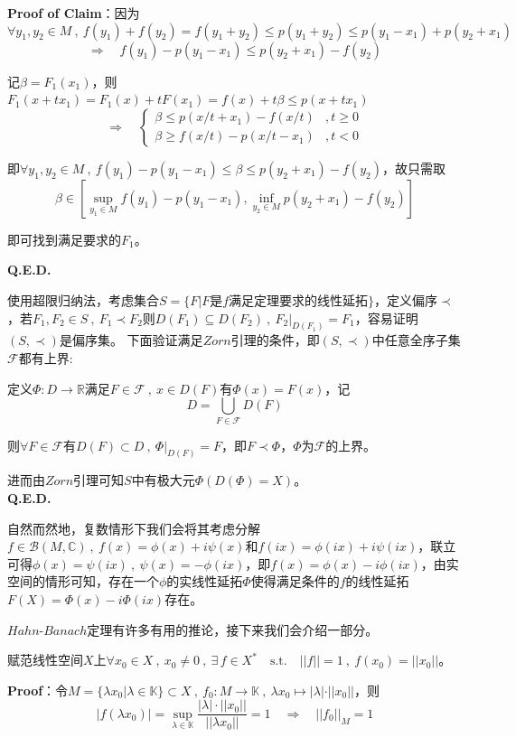 \textbf{Proof of Claim}：因为
\[\forall y_1,y_2 \in M \ , \ f(y_1)+f(y_2)=f(y_1+y_2) \leq p(y_1+y_2) \leq p(y_1-x_1) + p(y_2+x_1)\]
\[\Rightarrow \quad f(y_1)-p(y_1-x_1) \leq p(y_2+x_1)-f(y_2)\]

记$\beta=F_1(x_1)$，则$F_1(x+tx_1)=F_1(x)+tF(x_1)=f(x)+t\beta \leq p(x+tx_1)$
\[\Rightarrow \quad \left\{
\begin{array}{ll}
    \beta \leq p(x/t+x_1)-f(x/t) & ,t \geq 0 \\
    \beta \geq f(x/t)-p(x/t-x_1) & ,t < 0
\end{array}
\right.\]

即$\forall y_1,y_2 \in M \ , \ f(y_1)-p(y_1-x_1) \leq \beta \leq p(y_2+x_1)-f(y_2)$，故只需取
\[\beta \in \left[\sup_{y_1 \in M}f(y_1)-p(y_1-x_1),\inf_{y_2 \in M}p(y_2+x_1)-f(y_2)\right]\]

即可找到满足要求的$F_1$。

\textbf{Q.E.D.}

使用超限归纳法，考虑集合$S=\{F|F\text{是}f\text{满足定理要求的线性延拓}\}$，定义偏序$\prec$，若$F_1,F_2 \in S \ , \ F_1 \prec F_2$则$D(F_1) \subseteq D(F_2) \ , \ F_2|_{D(F_1)}=F_1$，容易证明$(S,\prec)$是偏序集。
下面验证满足$Zorn$引理的条件，即$(S,\prec)$中任意全序子集$\mathscr{F}$都有上界:

定义$\Phi:D \to \mathbb{R}$满足$F \in \mathscr{F} \ , \ x \in D(F)$有$\Phi(x)=F(x)$，记
\[D=\bigcup_{F \in \mathscr{F}}D(F)\]

则$\forall F \in \mathscr{F}$有$D(F) \subset D \ , \ \Phi|_{D(F)}=F$，即$F \prec \Phi$，$\Phi$为$\mathscr{F}$的上界。

进而由$Zorn$引理可知$S$中有极大元$\Phi (D(\Phi)=X)$。\\
\textbf{Q.E.D.}

自然而然地，复数情形下我们会将其考虑分解$f \in \mathscr{B}(M,\mathbb{C}) \ , \ f(x)=\phi(x)+i\psi(x)$和$f(ix)=\phi(ix)+i\psi(ix)$，联立可得$\phi(x)=\psi(ix) \ , \ \psi(x)=-\phi(ix)$，即$f(x)=\phi(x)-i\phi(ix)$，由实空间的情形可知，存在一个$\phi$的实线性延拓$\Phi$使得满足条件的$f$的线性延拓$F(X)=\Phi(x)-i\Phi(ix)$存在。

$Hahn$-$Banach$定理有许多有用的推论，接下来我们会介绍一部分。
\begin{proposition}
    赋范线性空间$X$上$\forall x_0 \in X \ , \ x_0 \neq 0 \ , \ \exists \, f \in X^* \quad \text{s.t.} \quad ||f||=1 \ , \ f(x_0)=||x_0||$。
\end{proposition}
\textbf{Proof}：令$M=\{\lambda x_0|\lambda \in \mathbb{K}\} \subset X \ , \ f_0:M \to \mathbb{K} \ , \ \lambda x_0 \mapsto |\lambda|\cdot||x_0||$，则
\[|f(\lambda x_0)|=\sup_{\lambda \in \mathbb{K}}\frac{|\lambda|\cdot||x_0||}{||\lambda x_0||}=1 \quad \Rightarrow \quad ||f_0||_M=1\]

